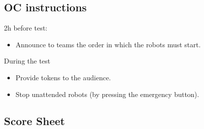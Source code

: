 \subsection{OC instructions}

2h before test:
\begin{itemize}
\item Announce to teams the order in which the robots must start.
\end{itemize}

During the test
\begin{itemize}
\item Provide tokens to the audience.
\item Stop unattended robots (by pressing the emergency button).
\end{itemize}

\subsection{Score Sheet}



